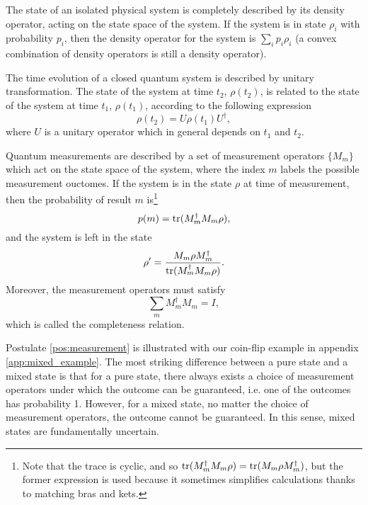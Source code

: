 \begin{postulate} \label{pos:state} %
    The state of an isolated physical system is completely described by its density operator, acting on the state space of the system. If the system is in state $\rho_i$ with probability $p_i$, then the density operator for the system is $\sum_i p_i \rho_i$ (a convex combination of density operators is still a density operator).
\end{postulate}

\begin{postulate} \label{pos:evolution}
    The time evolution of a closed quantum system is described by unitary transformation. The state of the system at time $t_2$, $\rho(t_2)$, is related to the state of the system at time $t_1$, $\rho(t_1)$, according to the following expression
    \begin{equation}
        \rho(t_2) = U \rho(t_1) U^\dagger,
    \end{equation}
    where $U$ is a unitary operator which in general depends on $t_1$ and $t_2$.
\end{postulate}

\begin{postulate} \label{pos:measurement}
    Quantum measurements are described by a set of measurement operators $\{M_m\}$ which act on the state space of the system, where the index $m$ labels the possible measurement ouctomes. If the system is in the state $\rho$ at time of measurement, then the probability of result $m$ is\footnote{Note that the trace is cyclic, and so $\operatorname{tr}(M_m^\dagger M_m \rho) = \operatorname{tr}(M_m \rho M_m^\dagger)$, but the former expression is used because it sometimes simplifies calculations thanks to matching bras and kets.} 
    \begin{equation}
        p(m) = \operatorname{tr}(M_m^\dagger M_m \rho),
    \end{equation}
    and the system is left in the state
    \begin{equation}
        \rho' = \frac{M_m \rho M_m^\dagger}{\operatorname{tr}(M_m^\dagger M_m \rho)}.
    \end{equation}
    Moreover, the measurement operators must satisfy
    \begin{equation}
        \sum_m M_m^\dagger M_m = I,
    \end{equation}
    which is called the completeness relation.
\end{postulate}

Postulate \ref{pos:measurement} is illustrated with our coin-flip example in appendix \ref{app:mixed_example}. The most striking difference between a pure state and a mixed state is that for a pure state, there always exists a choice of measurement operators under which the outcome can be guaranteed, i.e. one of the outcomes has probability 1. However, for a mixed state, no matter the choice of measurement operators, the outcome cannot be guaranteed. In this sense, mixed states are fundamentally uncertain.

